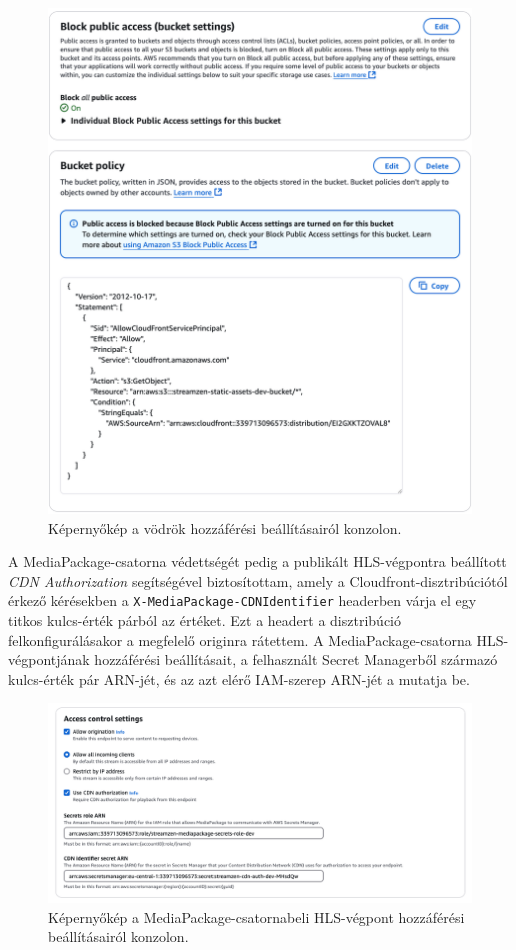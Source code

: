\begin{figure}[!ht]
  \centering
  \includegraphics[width=150mm, keepaspectratio]{figures/distro_s3policy.png}
  \caption{Képernyőkép a vödrök hozzáférési beállításairól konzolon.}
  \label{fig:s3policy}
\end{figure}

A MediaPackage-csatorna védettségét pedig a publikált HLS-végpontra beállított \emph{CDN Authorization}\cite{cdnauth} segítségével biztosítottam, amely a Cloudfront-disztribúciótól érkező kérésekben a \verb|X-MediaPackage-CDNIdentifier| headerben várja el egy titkos kulcs-érték párból az értéket. Ezt a headert a disztribúció felkonfigurálásakor a megfelelő originra rátettem. A MediaPackage-csatorna HLS-végpontjának hozzáférési beállításait, a felhasznált Secret Managerből származó kulcs-érték pár ARN-jét, és az azt elérő IAM-szerep ARN-jét a  mutatja be.

\begin{figure}[!ht]
  \centering
  \includegraphics[width=150mm, keepaspectratio]{figures/distro_mediapack.png}
  \caption{Képernyőkép a MediaPackage-csatornabeli HLS-végpont hozzáférési beállításairól konzolon.}
  \label{fig:mediapack}
\end{figure}


